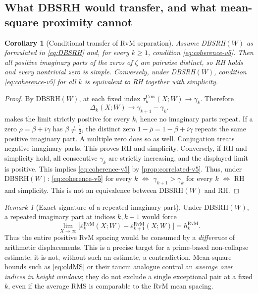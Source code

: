 \documentclass[11pt,a4paper]{article}
\numberwithin{equation}{section}
\newtheorem{corollary}[theorem]{Corollary}
\theoremstyle{definition}
\theoremstyle{remark}
\newtheorem{remark}[theorem]{Remark}
\newcommand{\Cms}{\mathrm{Cms}}
\begin{document}
\subsection{What DBSRH would transfer, and what mean-square proximity cannot}
\begin{corollary}[Conditional transfer of RvM separation]
\label{cor:rh-rvm-v5}
Assume DBSRH$(W)$ as formulated in \eqref{eq:DBSRH} and, for every
$k\ge1$, condition \eqref{eq:coherence-v5}.  Then all positive
imaginary parts of the zeros of $\zeta$ are pairwise distinct,
so RH holds and every nontrivial zero is simple.
Conversely, \emph{under DBSRH$(W)$}, condition
\eqref{eq:coherence-v5} for all $k$ is equivalent to RH
\emph{together with} simplicity.
\end{corollary}
\begin{proof}
By DBSRH$(W)$, at each fixed index
$\tau_k^{\Cms}(X;W)\to\gamma_k$.  Therefore
\begin{equation}
 \Delta_k(X;W)\longrightarrow\gamma_{k+1}-\gamma_k.
\end{equation}
 makes the limit strictly positive for every
$k$, hence no imaginary parts repeat.  If a zero
$\rho=\beta+i\gamma$ has $\beta\ne\tfrac12$, the distinct zero
$1-\overline\rho=1-\beta+i\gamma$ repeats the same positive
imaginary part.  A multiple zero does so as well.  Conjugation treats
negative imaginary parts.  This proves RH and simplicity.  Conversely,
if RH and simplicity hold, all consecutive $\gamma_k$ are strictly
increasing, and the displayed limit is positive.  This implies
\eqref{eq:coherence-v5} by \cref{prop:correlated-v5}.
Thus, under DBSRH$(W)$: \eqref{eq:coherence-v5} for every $k$ $\iff$
$\gamma_{k+1}>\gamma_k$ for every $k$ $\iff$ RH and simplicity. This is
not an equivalence between DBSRH$(W)$ and RH.
\end{proof}
\begin{remark}[Exact signature of a repeated imaginary part]
Under DBSRH$(W)$, a repeated imaginary part at indices $k,k+1$
would force
\begin{equation}\label{eq:dup-rvm-v5}
 \lim_{X\to\infty}
 \bigl[\varepsilon_k^{\mathrm{RvM}}(X;W)-
       \varepsilon_{k+1}^{\mathrm{RvM}}(X;W)\bigr]
 =h_k^{\mathrm{RvM}}.
\end{equation}
Thus the entire positive RvM spacing would be consumed by a
\emph{difference} of arithmetic displacements.  This is a precise
target for a prime-based non-collapse estimate; it is not, without
such an estimate, a contradiction.
Mean-square bounds such as \eqref{eq:oldMS} or their taucm analogue
control an \emph{average over indices in height windows}; they do not
exclude a single exceptional pair at a fixed $k$, even if the
average RMS is comparable to the RvM mean spacing.
\end{remark}
\end{document}

